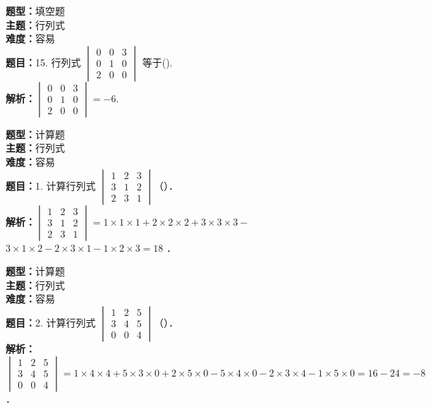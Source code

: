 \documentclass{ctexart}
\newenvironment{question}[5]{%
	\noindent\textbf{题型：}#1\\
	\textbf{主题：}#2\\
	\textbf{难度：}#3\\
	\textbf{题目：}#4\\
	\textbf{解析：}#5\\
	\vspace{1em}
}{}
\begin{document}
	\begin{question}
		{填空题}
		{行列式}
		{容易}
		{15. 行列式 \(\begin{vmatrix} 0 & 0 & 3 \\ 0 & 1 & 0 \\ 2 & 0 & 0\end{vmatrix}\) 等于(\qquad). }
		{\(\begin{vmatrix} 0 & 0 & 3 \\ 0 & 1 & 0 \\ 2 & 0 & 0\end{vmatrix}=-6\).}
	\end{question}	
	
	
	
	
	
	
	
	
	
	
	
	
	
	
	
	
	\begin{question} 
		{计算题} 
		{行列式}
		{容易}
		{1. 计算行列式 \(\begin{vmatrix} 1 & 2 & 3 \\ 3 & 1 & 2 \\ 2 & 3 & 1\end{vmatrix}\)（）．}
		{\(\begin{vmatrix} 1 & 2 & 3 \\ 3 & 1 & 2 \\ 2 & 3 & 1\end{vmatrix}=1 \times 1 \times 1+2 \times 2 \times 2+3 \times 3 \times 3-\) \(3 \times 1 \times 2-2 \times 3 \times 1-1 \times 2 \times 3=18\) ．}
	\end{question}
	
	\begin{question} 
		{计算题} 
		{行列式}
		{容易}
		{2. 计算行列式 \(\begin{vmatrix} 1 & 2 & 5 \\ 3 & 4 & 5 \\ 0 & 0 & 4\end{vmatrix}\)（）．}
		{\(\begin{vmatrix} 1 & 2 & 5 \\ 3 & 4 & 5 \\ 0 & 0 & 4\end{vmatrix}=1 \times 4 \times 4+5 \times 3 \times 0+2 \times 5 \times 0-5 \times 4 \times 0-2 \times 3 \times 4-1 \times 5 \times 0=16-24=-8\)．}
	\end{question}
	
\end{document}
